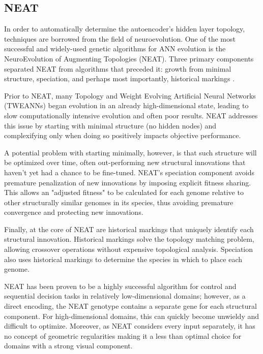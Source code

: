 \documentclass{acm_proc_article-sp}
\begin{document}
\newpage %
\subsection{NEAT}
In order to automatically determine the autoencoder's hidden layer topology, techniques are borrowed from the field of neuroevolution.  One of the most successful and widely-used genetic algorithms for ANN evolution is the NeuroEvolution of Augmenting Topologies (NEAT).  Three primary components separated NEAT from algorithms that preceded it: growth from minimal structure, speciation, and perhaps most importantly, historical markings \cite{Stanley:2002:ENN:638553.638554}.

Prior to NEAT, many Topology and Weight Evolving Artificial Neural Networks (TWEANNs) began evolution in an already high-dimensional state, leading to slow computationally intensive evolution and often poor results.  NEAT addresses this issue by starting with minimal structure (no hidden nodes) and complexifying only when doing so positively impacts objective performance.  

A potential problem with starting minimally, however, is that such structure will be optimized over time, often out-performing new structural innovations that haven't yet had a chance to be fine-tuned.  NEAT's speciation component avoids premature penalization of new innovations by imposing explicit fitness sharing.  This allows an "adjusted fitness" to be calculated for each genome relative to other structurally similar genomes in its species, thus avoiding premature convergence and protecting new innovations.

Finally, at the core of NEAT are historical markings that uniquely identify each structural innovation.  Historical markings solve the topology matching problem, allowing crossover operations without expensive topological analysis.  Speciation also uses historical markings to determine the species in which to place each genome.

NEAT has been proven to be a highly successful algorithm for control and sequential decision tasks in relatively low-dimensional domains; however, as a direct encoding, the NEAT genotype contains a separate gene for each structural component.  For high-dimensional domains, this can quickly become unwieldy and difficult to optimize.  Moreover, as NEAT considers every input separately, it has no concept of geometric regularities making it a less than optimal choice for domains with a strong visual component.
\end{document}
